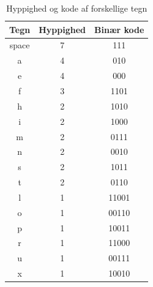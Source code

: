 \begin{table}
\begin{center}
\begin{tabular}{|c|c|c|}
\hline
Tegn & Hyppighed & Binær kode \\
\hline \hline
space & 7 & 111 \\ 
\hline 
a & 4 & 010 \\ 
\hline 
e & 4 & 000 \\ 
\hline 
f & 3 & 1101 \\ 
\hline 
h & 2 & 1010 \\ 
\hline 
i & 2 & 1000 \\ 
\hline 
m & 2 & 0111 \\ 
\hline 
n & 2 & 0010 \\ 
\hline 
s & 2 & 1011 \\ 
\hline 
t & 2 & 0110 \\ 
\hline 
l & 1 & 11001 \\ 
\hline 
o & 1 & 00110 \\ 
\hline 
p & 1 & 10011 \\ 
\hline 
r & 1 & 11000 \\ 
\hline 
u & 1 & 00111 \\ 
\hline 
x & 1 & 10010 \\ 
\hline 
\end{tabular}
\caption{Hyppighed og kode af forskellige tegn}
\label{tab:huffmantable}
 \end{center}
\end{table}